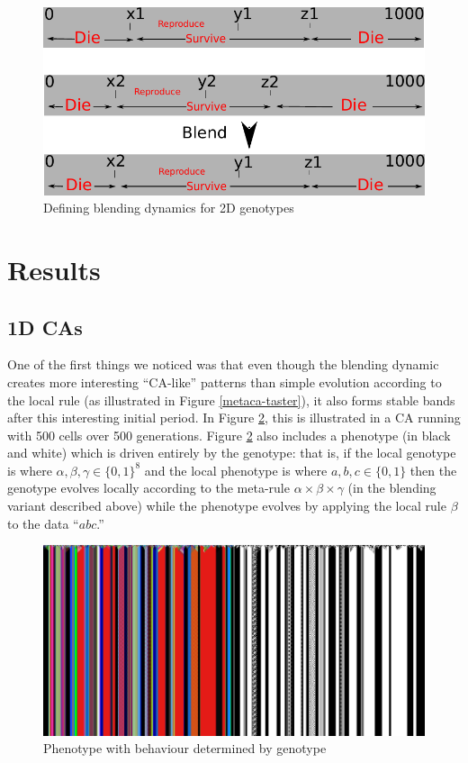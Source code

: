 \documentclass{AISB2008}
\makeatletter
\renewcommand{\boxed}[1]{\text{\fboxsep=.2em\fbox{\m@th$\displaystyle#1$}}}
\newcommand{\mystrut}{\vphantom{b\gamma}}
\makeatother
\begin{document}
\newpage

\begin{figure}[!ht]
\includegraphics[width=\columnwidth]{2dgenotypeblend}
\caption{Defining blending dynamics for 2D genotypes\label{blending-2d-rule}}
\end{figure}


\section{Results}
\subsection{1D CAs} \label{1d-results}

One of the first things we noticed was that even though the blending
dynamic creates more interesting ``CA-like'' patterns than simple
evolution according to the local rule (as illustrated in Figure
\ref{metaca-taster}), it also forms stable bands after this
interesting initial period.  In Figure \ref{flag}, this is illustrated
in a CA running with 500 cells over 500 generations.  Figure
\ref{flag} also includes a phenotype (in black and white) which is
driven entirely by the genotype: that is, if the local genotype is
\boxed{\alpha\mystrut}\boxed{\beta\mystrut}\boxed{\gamma\mystrut} 
where $\alpha, \beta, \gamma \in \{0,1\}^8$
and the local phenotype is
%
\boxed{a\mystrut}\boxed{b\mystrut}\boxed{c\mystrut}
where $a, b, c \in \{0,1\}$
%
then the genotype evolves locally according to the meta-rule $\alpha
\times \beta \times \gamma$ (in the blending variant described above)
while the phenotype evolves by applying the local rule $\beta$ to the
data ``$abc$.''

\begin{figure}
\includegraphics[width=\columnwidth]{flag.png}
\caption{Phenotype with behaviour determined by genotype\label{flag}}
\end{figure}
\end{document}
